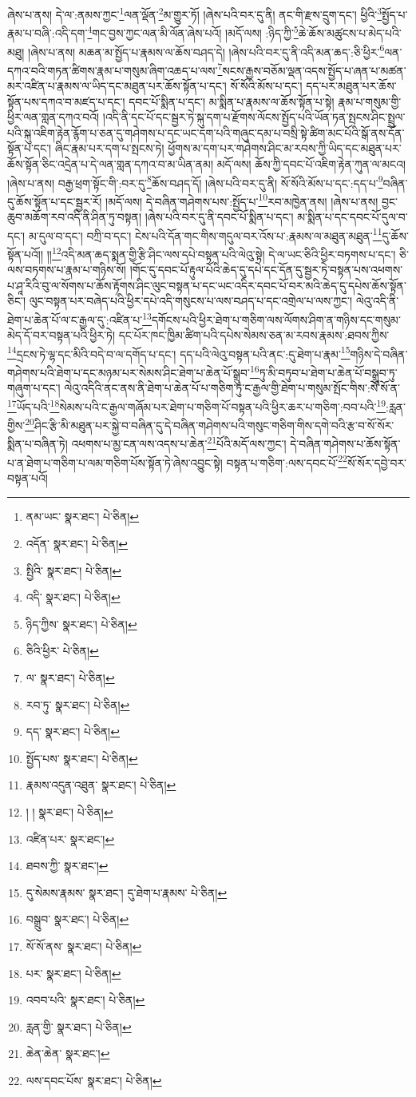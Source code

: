 ཞེས་པ་ནས། དེ་ལ་:ནམས་ཀྱང་\footnote{ནམ་ཡང་  སྣར་ཐང་།  པེ་ཅིན། }ལན་ལྡོན་\footnote{འདོན་  སྣར་ཐང་།  པེ་ཅིན། }མ་གྱུར་ཏོ། །ཞེས་པའི་བར་དུ་ནི། ནང་གི་རྫས་དྲུག་དང་། ཕྱིའི་\footnote{སྤྱིའི་  སྣར་ཐང་།  པེ་ཅིན། }སྤྱོད་པ་རྣམ་པ་བཞི་:འདི་དག་\footnote{འདི་  སྣར་ཐང་།  པེ་ཅིན། }གང་བྱས་ཀྱང་ལན་མི་ལོན་ཞེས་པའོ། །མདོ་ལས། :ཉིད་ཀྱི་\footnote{ཉིད་ཀྱིས་  སྣར་ཐང་།  པེ་ཅིན། }ཆེ་ཆོས་མཚུངས་པ་མེད་པའི་མཐུ། །ཞེས་པ་ནས། མཆན་མ་སྤྱོད་པ་རྣམས་ལ་ཆོས་བཤད་དེ། །ཞེས་པའི་བར་དུ་ནི་འདི་མན་ཆད་:ཅི་ཕྱིར་\footnote{ཅིའི་ཕྱིར་  པེ་ཅིན། }ལན་དཀའ་བའི་གཏན་ཚིགས་རྣམ་པ་གསུམ་ཞིག་འཆད་པ་ལས་\footnote{ལ་  སྣར་ཐང་།  པེ་ཅིན། }སངས་རྒྱས་བཅོམ་ལྡན་འདས་སྤྱོད་པ་ཞན་པ་མཚན་མར་འཛིན་པ་རྣམས་ལ་ཡིད་དང་མཐུན་པར་ཆོས་སྟོན་པ་དང་། སོ་སོའི་མོས་པ་དང་། དད་པར་མཐུན་པར་ཆོས་སྟོན་པས་དཀའ་བ་མཛད་པ་དང་། དབང་པོ་སྨིན་པ་དང་། མ་སྨིན་པ་རྣམས་ལ་ཆོས་སྟོན་པ་སྟེ། རྣམ་པ་གསུམ་གྱི་ཕྱིར་ལན་གླན་དཀའ་བའོ། །འདི་ནི་དང་པོ་དང་སྦྱར་ཏེ་སྐུ་དག་པ་རྫོགས་ལོངས་སྤྱོད་པའི་ཡོན་ཏན་སྤངས་ཤིང་སྤྲུལ་པའི་སྐུ་འཇིག་རྟེན་རྙོག་པ་ཅན་དུ་གཤེགས་པ་དང་ཡང་དག་པའི་གཞུང་དམ་པ་བསྲི་སྟེ་ཚིག་མང་པོའི་སྒོ་ནས་དོན་སྟོན་པ་དང་། ཞིང་རྣམ་པར་དག་པ་སྤངས་ཏེ། ཕྱོགས་མ་དག་པར་གཤེགས་ཤིང་མ་རབས་ཀྱི་ཡིད་དང་མཐུན་པར་ཆོས་སྟོན་ཅིང་འདྲེན་པ་དེ་ལན་གླན་དཀའ་བ་མ་ཡིན་ནམ། མདོ་ལས། ཆོས་ཀྱི་དབང་པོ་འཇིག་རྟེན་ཀུན་ལ་མངའ། །ཞེས་པ་ནས། བརྒྱ་ཕྲག་སྟོང་གི་:བར་དུ་\footnote{རབ་ཏུ་  སྣར་ཐང་།  པེ་ཅིན། }ཆོས་བཤད་དོ། །ཞེས་པའི་བར་དུ་ནི། སོ་སོའི་མོས་པ་དང་:དད་པ་\footnote{དད་  སྣར་ཐང་།  པེ་ཅིན། }བཞིན་དུ་ཆོས་སྟོན་པ་དང་སྦྱར་རོ། །མདོ་ལས། དེ་བཞིན་གཤེགས་པས་:སྤྱོད་པ་\footnote{སྤྱོད་པས་  སྣར་ཐང་།  པེ་ཅིན། }རབ་མཁྱེན་ནས། །ཞེས་པ་ནས། བྱང་ཆུབ་མཆོག་རབ་འདི་ནི་ཤིན་ཏུ་བསྟན། །ཞེས་པའི་བར་དུ་ནི་དབང་པོ་སྨིན་པ་དང་། མ་སྨིན་པ་དང་དབང་པོ་དུལ་བ་དང་། མ་དུལ་བ་དང་། བཀྲི་བ་དང་། ངེས་པའི་དོན་གང་གིས་གདུལ་བར་འོས་པ་:རྣམས་ལ་མཐུན་མཐུན་\footnote{རྣམས་འདུན་འཐུན་  སྣར་ཐང་།  པེ་ཅིན། }དུ་ཆོས་སྟོན་པའོ།། །།\footnote{། །  སྣར་ཐང་།  པེ་ཅིན། }འདི་མན་ཆད་སྨན་གྱི་རྩི་ཤིང་ལས་དཔེ་བསྟན་པའི་ལེའུ་སྟེ། དེ་ལ་ཡང་ཅིའི་ཕྱིར་བཏགས་པ་དང་། ཅི་ལས་བཏགས་པ་རྣམ་པ་གཉིས་སོ། །གོང་དུ་དབང་པོ་རྟུལ་པོའི་ཆེད་དུ་དཔེ་དང་དོན་དུ་སྦྱར་ཏེ་བསྟན་པས་འཕགས་པ་ཤཱ་རིའི་བུ་ལ་སོགས་པ་ཆོས་རྟོགས་ཤིང་ལུང་བསྟན་པ་དང་ཡང་འདིར་དབང་པོ་བར་མའི་ཆེད་དུ་དཔེས་ཆོས་སྟོན་ཅིང་། ལུང་བསྟན་པར་བཞེད་པའི་ཕྱིར་དཔེ་འདི་གསུངས་པ་ལས་བཤད་པ་དང་འགྲེལ་པ་ལས་ཀྱང་། ལེའུ་འདི་ནི་ཐེག་པ་ཆེན་པོ་ལ་ང་རྒྱལ་དུ་:འཛིན་པ་\footnote{འཛིན་པར་  སྣར་ཐང་། }དགོངས་པའི་ཕྱིར་ཐེག་པ་གཅིག་ལས་ལོགས་ཤིག་ན་གཉིས་དང་གསུམ་མེད་དོ་བར་བསྟན་པའི་ཕྱིར་ཏེ། དང་པོར་ཁང་ཁྱིམ་ཚིག་པའི་དཔེས་སེམས་ཅན་མ་རབས་རྣམས་:ཐབས་ཀྱིས་\footnote{ཐབས་ཀྱི་  སྣར་ཐང་། }དྲངས་ཏེ་ལྷ་དང་མིའི་བདེ་བ་ལ་དགོད་པ་དང་། དད་པའི་ལེའུ་བསྟན་པའི་ནང་:དུ་ཐེག་པ་རྣམ་\footnote{དུ་སེམས་རྣམས་  སྣར་ཐང་། དུ་ཐེག་པ་རྣམས་  པེ་ཅིན། }གཉིས་དེ་བཞིན་གཤེགས་པའི་ཐེག་པ་དང་མཉམ་པར་སེམས་ཤིང་ཐེག་པ་ཆེན་པོ་སྒྲུབ་\footnote{བསྒྲུབ་  སྣར་ཐང་།  པེ་ཅིན། }ཏུ་མི་བཏུབ་པ་ཐེག་པ་ཆེན་པོ་བསྒྲུབ་ཏུ་གཞུག་པ་དང་། ལེའུ་འདིའི་ནང་ནས་ནི་ཐེག་པ་ཆེན་པོ་པ་གཅིག་ཏུ་ང་རྒྱལ་གྱི་ཐེག་པ་གསུམ་སྤོང་གིས་:སོ་སོ་ན་\footnote{སོ་སོ་ནས་  སྣར་ཐང་།  པེ་ཅིན། }ཡོད་པའི་\footnote{པར་  སྣར་ཐང་།  པེ་ཅིན། }སེམས་པའི་ང་རྒྱལ་གཞོམ་པར་ཐེག་པ་གཅིག་པོ་བསྟན་པའི་ཕྱིར་ཆར་པ་གཅིག་:བབ་པའི་\footnote{འབབ་པའི་  སྣར་ཐང་།  པེ་ཅིན། }:རླན་གྱིས་\footnote{རླན་གྱི་  སྣར་ཐང་།  པེ་ཅིན། }ཤིང་རྩི་མི་མཐུན་པར་སྐྱེ་བ་བཞིན་དུ་དེ་བཞིན་གཤེགས་པའི་གསུང་གཅིག་གིས་དགེ་བའི་རྩ་བ་སོ་སོར་སྨིན་པ་བཞིན་ཏེ། འཕགས་པ་མྱ་ངན་ལས་འདས་པ་ཆེན་\footnote{ཆེན་ཆེན་  སྣར་ཐང་། }པོའི་མདོ་ལས་ཀྱང་། དེ་བཞིན་གཤེགས་པ་ཆོས་སྟོན་པ་ན་ཐེག་པ་གཅིག་པ་ལམ་གཅིག་པོས་སྟོན་ཏེ་ཞེས་འབྱུང་སྟེ། བསྟན་པ་གཅིག་:ལས་དབང་པོ་\footnote{ལས་དབང་པོས་  སྣར་ཐང་།  པེ་ཅིན། }སོ་སོར་དབྱེ་བར་བསྟན་པའོ། 